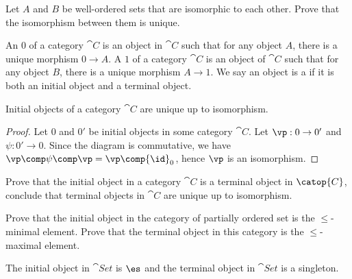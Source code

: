 \documentclass[10pt]{article}
\begin{document}
\begin{problem}
    Let $A$ and $B$ be well-ordered sets that are isomorphic to each other. Prove that the isomorphism between them is unique.
\end{problem}
\begin{definition}
    An  $0$ of a category $\cat{C}$ is an object in $\cat{C}$ such that for any object $A$, there is a unique morphism $0\to A$. A  $1$ of a category $\cat{C}$ is an object of $\cat{C}$ such that for any object $B$, there is a unique morphism $A\to 1$. We say an object is a  if it is both an initial object and a terminal object.
\end{definition}
\begin{proposition}
    Initial objects of a category $\cat{C}$ are unique up to isomorphism.
\end{proposition}
\begin{proof}
    Let $0$ and $0'$ be initial objects in some category $\cat{C}$. Let $\vp:0\to 0'$ and $\psi:0'\to 0$. Since the diagram is commutative, we have $\vp\comp\psi\comp\vp=\vp\comp{\id}_{0}$, hence $\vp$ is an isomorphism. 
\end{proof}
\begin{center}
\end{center}
\begin{problem}
    Prove that the initial object in a category $\cat{C}$ is a terminal object in $\catop{C}$, conclude that terminal objects in $\cat{C}$ are unique up to isomorphism.
\end{problem}
\begin{problem}
    Prove that the initial object in the category of partially ordered set is the $\le$-minimal element. Prove that the terminal object in this category is the $\le$-maximal element.
\end{problem}
\begin{proposition}
    The initial object in $\cat{Set}$ is $\es$ and the terminal object in $\cat{Set}$ is a singleton.
\end{proposition}
\end{document}
